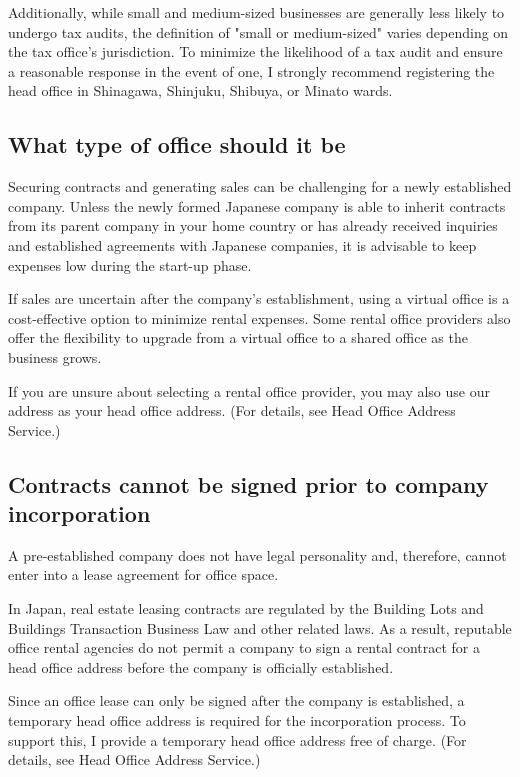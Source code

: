 Additionally, while small and medium-sized businesses are generally less likely to undergo tax audits, the definition of "small or medium-sized" varies depending on the tax office's jurisdiction. To minimize the likelihood of a tax audit and ensure a reasonable response in the event of one, I strongly recommend registering the head office in Shinagawa, Shinjuku, Shibuya, or Minato wards.

\subsection{What type of office should it be}

Securing contracts and generating sales can be challenging for a newly established company. Unless the newly formed Japanese company is able to inherit contracts from its parent company in your home country or has already received inquiries and established agreements with Japanese companies, it is advisable to keep expenses low during the start-up phase.

If sales are uncertain after the company's establishment, using a virtual office is a cost-effective option to minimize rental expenses. Some rental office providers also offer the flexibility to upgrade from a virtual office to a shared office as the business grows.

If you are unsure about selecting a rental office provider, you may also use our address as your head office address. (For details, see  Head Office Address Service.)

\subsection{Contracts cannot be signed prior to company incorporation}

A pre-established company does not have legal personality and, therefore, cannot enter into a lease agreement for office space.

In Japan, real estate leasing contracts are regulated by the Building Lots and Buildings Transaction Business Law and other related laws. As a result, reputable office rental agencies do not permit a company to sign a rental contract for a head office address before the company is officially established.

Since an office lease can only be signed after the company is established, a temporary head office address is required for the incorporation process. To support this, I provide a temporary head office address free of charge. (For details, see Head Office Address Service.)

